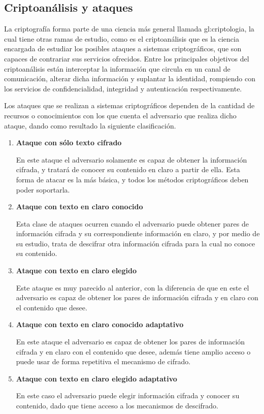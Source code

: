
\subsection{Criptoanálisis y ataques}
\label{sec:criptoanalisis}

  La criptografía forma parte de una ciencia más general llamada
  \gls{gl:criptologia}, la cual tiene otras ramas de estudio, como es el
  criptoanálisis que es la ciencia encargada de estudiar los posibles ataques a
  sistemas criptográficos, que son capaces de contrariar sus servicios
  ofrecidos. Entre los principales objetivos del criptoanálisis están
  interceptar la información que circula en un canal de comunicación, alterar
  dicha información y suplantar la identidad, rompiendo con los servicios de
  confidencialidad, integridad y autenticación respectivamente.

  Los ataques que se realizan a sistemas criptográficos dependen de la cantidad
  de recursos o conocimientos con los que cuenta el adversario que realiza dicho
  ataque, dando como resultado la siguiente clasificación.

  \begin{enumerate}

    \item \textbf{Ataque con sólo texto cifrado}

      En este ataque el adversario solamente es capaz de obtener la información
      cifrada, y tratará de conocer su contenido en claro a partir de ella.
      Esta forma de atacar es la más básica, y todos los métodos
      criptográficos deben poder soportarla.

    \item \textbf{Ataque con texto en claro conocido}

      Esta clase de ataques ocurren cuando el adversario puede obtener pares
      de información cifrada y su correspondiente información en claro, y
      por medio de su estudio, trata de descifrar otra información cifrada
      para la cual no conoce su contenido.

    \item \textbf{Ataque con texto en claro elegido}

      Este ataque es muy parecido al anterior, con la diferencia de que en
      este el adversario es capaz de obtener los pares de información
      cifrada y en claro con el contenido que desee.

    \item \textbf{Ataque con texto en claro conocido adaptativo}

      En este ataque el adversario es capaz de obtener los pares de
      información cifrada y en claro con el contenido que desee, además
      tiene amplio acceso o puede usar de forma repetitiva el mecanismo de
      cifrado.

    \item \textbf{Ataque con texto en claro elegido adaptativo}

      En este caso el adversario puede elegir información cifrada y conocer
      su contenido, dado que tiene acceso a los mecanismos de descifrado.

  \end{enumerate}
